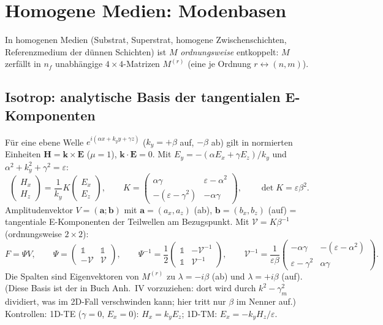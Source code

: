 \section{Homogene Medien: Modenbasen}\label{sec:homog}
In homogenen Medien (Substrat, Superstrat, homogene Zwischenschichten, Referenzmedium der
dünnen Schichten) ist $M$ \emph{ordnungsweise} entkoppelt: $M$ zerfällt in $n_f$ unabhängige
$4\times4$-Matrizen $M^{(r)}$ (eine je Ordnung $r\leftrightarrow(n,m)$).

\subsection{Isotrop: analytische Basis der tangentialen E-Komponenten}
Für eine ebene Welle $e^{i(\alpha x+k_yy+\gamma z)}$ ($k_y=+\beta$ auf, $-\beta$ ab) gilt in normierten
Einheiten $\mathbf H=\mathbf k\times\mathbf E$ ($\mu=1$), $\mathbf k\cdot\mathbf E=0$. Mit
$E_y=-(\alpha E_x+\gamma E_z)/k_y$ und $\alpha^2+k_y^2+\gamma^2=\varepsilon$:
\begin{equation}
  \begin{pmatrix}H_x\\H_z\end{pmatrix}=\frac{1}{k_y}K\begin{pmatrix}E_x\\E_z\end{pmatrix},\qquad
  K=\begin{pmatrix}\alpha\gamma&\varepsilon-\alpha^2\\-(\varepsilon-\gamma^2)&-\alpha\gamma\end{pmatrix},\qquad
  \det K=\varepsilon\beta^2 .
  \label{eq:Kmat}
\end{equation}
Amplitudenvektor $V=(\mathbf a;\mathbf b)$ mit $\mathbf a=(a_x,a_z)$ (ab), $\mathbf b=(b_x,b_z)$ (auf) = tangentiale
E-Komponenten der Teilwellen am Bezugspunkt. Mit $\mathcal V=K\beta^{-1}$ (ordnungsweise $2\times2$):
\begin{equation}
  F=\Psi V,\qquad \Psi=\begin{pmatrix}\mathbb 1&\mathbb 1\\-\mathcal V&\mathcal V\end{pmatrix},\qquad
  \Psi^{-1}=\frac12\begin{pmatrix}\mathbb 1&-\mathcal V^{-1}\\\mathbb 1&\mathcal V^{-1}\end{pmatrix},\qquad
  \mathcal V^{-1}=\frac{1}{\varepsilon\beta}\begin{pmatrix}-\alpha\gamma&-(\varepsilon-\alpha^2)\\\varepsilon-\gamma^2&\alpha\gamma\end{pmatrix}.
  \label{eq:Psi_iso}
\end{equation}
Die Spalten sind Eigenvektoren von $M^{(r)}$ zu $\lambda=-i\beta$ (ab) und $\lambda=+i\beta$ (auf).
(Diese Basis ist der in Buch Anh.~IV vorzuziehen: dort wird durch $k^2-\gamma_m^2$ dividiert, was im 2D-Fall
verschwinden kann; hier tritt nur $\beta$ im Nenner auf.) Kontrollen: 1D-TE ($\gamma=0$, $E_x=0$):
$H_x=k_yE_z$; 1D-TM: $E_x=-k_yH_z/\varepsilon$.

